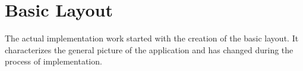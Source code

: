 %
\newpage
\section{Basic Layout}
	\label{sec:basiclayout}
The actual implementation work started with the creation of the basic layout. It characterizes the general picture of the application and has changed during the process of implementation.

